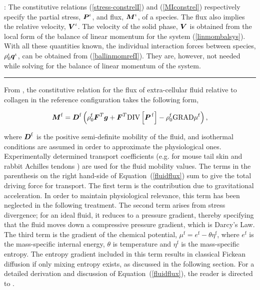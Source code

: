 : The constitutive relations
(\ref{stress-constrelI}) and (\ref{MIconstrel}) respectively
specify the partial stress, $\mbox{\boldmath$ P$}^\iota$, and flux, $\mbox{\boldmath$ M$}^\iota$, of
a species. The flux also implies the relative velocity,
$\mbox{\boldmath$ V$}^\iota$. The velocity of the solid phase, $\mbox{\boldmath$ V$}$ is obtained
from the local form of the balance of linear momentum for the
system (\ref{linmombalsys}). With all these quantities known, the
individual interaction forces between species,
$\rho^\iota_0\mbox{\boldmath$ q$}^\iota$, can be obtained from
(\ref{ballinmomrefI}). They are, however, not needed while solving
for the balance of linear momentum of the system.

\hrule

From \citet{growthpaper}, the constitutive relation for the flux of 
extra-cellular fluid relative to collagen in the reference
configuration takes the following form,

\begin{equation}
\mbox{\boldmath$ M$}^\mathrm{f} = \mbox{\boldmath$ D$}^\mathrm{f}\left(\rho_0^\mathrm{f}\mbox{\boldmath$ F$}^T\mbox{\boldmath$ g$} +
      \mbox{\boldmath$ F$}^T\mathrm{DIV}\left[\mbox{\boldmath$ P$}^{\,\mathrm{f}}\right] -
      \rho_0^\mathrm{f}\mathrm{GRAD}\mu^\mathrm{f}\right),
\label{fluidflux}
\end{equation}

\noindent where $\mbox{\boldmath$ D$}^\mathrm{f}$ is the positive semi-definite
mobility of the fluid, and isothermal conditions are assumed in order to
approximate the physiological ones. Experimentally determined
transport coefficients (e.g. for mouse tail skin \citep{Swartzetal:99}
and rabbit Achilles tendons \citep{Hanetal:2000}) are used for the
fluid mobility values. The terms in the parenthesis on the right
hand-side of \mbox{Equation (\ref{fluidflux})} sum to give the
total driving force for transport. The first term is the contribution
due to gravitational acceleration. In order to maintain physiological
relevance, this term has been neglected in the following
treatment. The second term arises from stress divergence; for an ideal
fluid, it reduces to a pressure gradient, thereby specifying that the
fluid moves down a compressive pressure gradient, which is Darcy's
Law. The third term is the gradient of the chemical
potential, $\mu^\mathrm{f} = e^\mathrm{f} - \theta \eta^\mathrm{f}$,
where $e^\mathrm{f}$ is the mass-specific internal energy, $\theta$ is
temperature and $\eta^\mathrm{f}$ is the mass-specific entropy. The
entropy gradient included in this term results in 
classical Fickean diffusion if only mixing entropy exists, as
discussed in the following section. For a
detailed derivation and discussion of \mbox{Equation
(\ref{fluidflux})}, the reader is directed to \citet{growthpaper}.

